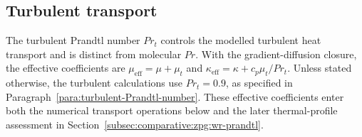\subsection{Turbulent transport}

The turbulent Prandtl number \(Pr_t\) controls the modelled turbulent heat
transport and is distinct from molecular \(Pr\). With the gradient-diffusion
closure, the effective coefficients are
\(\mu_{\mathrm{eff}}=\mu+\mu_t\) and
\(\kappa_{\mathrm{eff}}=\kappa+c_p\mu_t/Pr_t\).
Unless stated otherwise, the turbulent calculations use \(Pr_t=0.9\), as
specified in Paragraph~\ref{para:turbulent-Prandtl-number}.
These effective coefficients enter both the numerical transport operations
below and the later thermal-profile assessment in
Section~\ref{subsec:comparative:zpg:wr-prandtl}.
